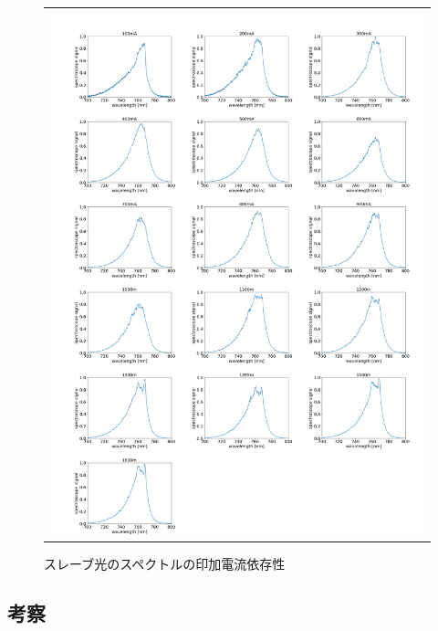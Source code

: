 \documentclass[uplatex, dvipdfmx, a4paper, report, papersize, 11pt]{jsbook}
\begin{document}
\newpage
\begin{figure}[H]
  \centering
    \begin{tabular}{c}
      \begin{minipage}{1\hsize}
        \centering
          \includegraphics[keepaspectratio,  scale=0.20,  angle=0]
                          {figures/chapter4/766_slave-current_spectrum.png}
                          \caption{スレーブ光のスペクトルの印加電流依存性}
                          \label{766_slave-current_spectrum}
      \end{minipage}

  \end{tabular}
\end{figure}
\newpage




\subsection{考察}
\end{document}
